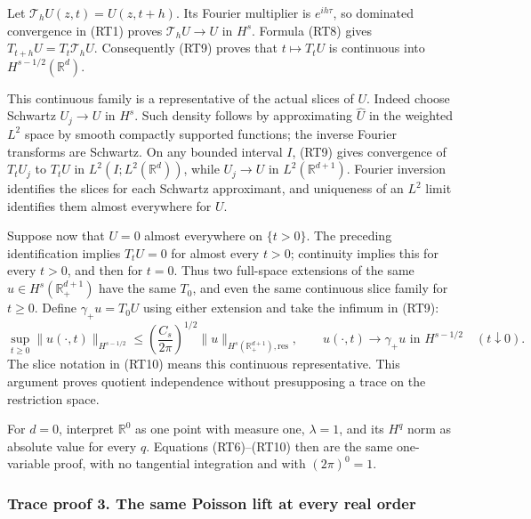 \documentclass[
  11pt,
]{article}
\makeatletter
\let\ReaderOriginalAnchorStart\hyper@anchorstart
\let\ReaderOriginalAnchorEnd\hyper@anchorend
\let\ReaderPendingAliases\@empty
\def\ReaderArmAliases#1{\gdef\ReaderPendingAliases{#1}}
\def\hyper@anchorstart#1{\ReaderIfNativeAnchorTF{#1}{\ReaderPendingAliases\global\let\ReaderPendingAliases\@empty}{}\ReaderOriginalAnchorStart{#1}}
\makeatother
\begin{document}
Let \(\mathcal T_hU(z,t)=U(z,t+h)\). Its Fourier multiplier is
\(e^{ih\tau}\), so dominated convergence in (RT1) proves
\(\mathcal T_hU\to U\) in \(H^s\). Formula (RT8) gives
\(T_{t+h}U=T_t\mathcal T_hU\). Consequently (RT9) proves that
\(t\mapsto T_tU\) is continuous into \(H^{s-1/2}(\mathbb R^d)\).

This continuous family is a representative of the actual slices of
\(U\). Indeed choose Schwartz \(U_j\to U\) in \(H^s\). Such density
follows by approximating \(\widehat U\) in the weighted \(L^2\) space by
smooth compactly supported functions; the inverse Fourier transforms are
Schwartz. On any bounded interval \(I\), (RT9) gives convergence of
\(T_tU_j\) to \(T_tU\) in \(L^2(I;L^2(\mathbb R^d))\), while
\(U_j\to U\) in \(L^2(\mathbb R^{d+1})\). Fourier inversion identifies
the slices for each Schwartz approximant, and uniqueness of an \(L^2\)
limit identifies them almost everywhere for \(U\).

Suppose now that \(U=0\) almost everywhere on \(\{t>0\}\). The preceding
identification implies \(T_tU=0\) for almost every \(t>0\); continuity
implies this for every \(t>0\), and then for \(t=0\). Thus two
full-space extensions of the same \(u\in H^s(\mathbb R^{d+1}_+)\) have
the same \(T_0\), and even the same continuous slice family for
\(t\geq0\). Define \(\gamma_+u=T_0U\) using either extension and take
the infimum in (RT9): \[
 \sup_{t\geq0}\|u(\cdot,t)\|_{H^{s-1/2}}
 \leq\left(\frac{C_s}{2\pi}\right)^{1/2}
       \|u\|_{H^s(\mathbb R^{d+1}_+),\mathrm{res}},
 \qquad
 u(\cdot,t)\longrightarrow\gamma_+u\text{ in }H^{s-1/2}
 \quad(t\downarrow0).
 \tag{RT10}
\] The slice notation in (RT10) means this continuous representative.
This argument proves quotient independence without presupposing a trace
on the restriction space.

For \(d=0\), interpret \(\mathbb R^0\) as one point with measure one,
\(\lambda=1\), and its \(H^q\) norm as absolute value for every \(q\).
Equations (RT6)--(RT10) then are the same one-variable proof, with no
tangential integration and with \((2\pi)^0=1\).

\ReaderArmAliases{\ReaderOriginalAnchorStart{trace-proof-3-the-same-poisson-lift-at-every-real-order}\ReaderOriginalAnchorEnd\begingroup\expandafter\def\csname @currentHref\endcsname{trace-proof-3-the-same-poisson-lift-at-every-real-order}\label{trace-proof-3-the-same-poisson-lift-at-every-real-order}\endgroup\ReaderOriginalAnchorStart{trace-proof-3.-the-same-poisson-lift-at-every-real-order}\ReaderOriginalAnchorEnd}
\subsubsection{Trace proof 3. The same Poisson lift at every real
order}\label{trace-proof-3.-the-same-poisson-lift-at-every-real-order}
\end{document}
